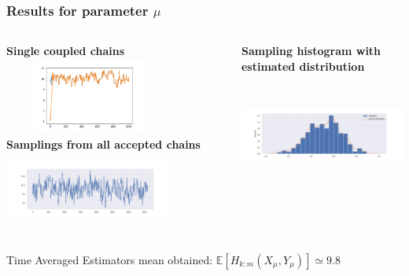 \documentclass{beamer}
\begin{document}
\begin{frame}
	\frametitle{Results for parameter $\mu$}
	\begin{columns}
		\begin{column}{0.4\textwidth}
		{\scriptsize \textbf{Single coupled chains}}\\
		\includegraphics[width=5.5cm,height=2.5cm]{doublecoupling_chainmeeting/doublecoupling_mu_chain_meeting}
		\vspace{0.2cm}
	{	\scriptsize \textbf{Samplings from all accepted chains }}\\
	\includegraphics[width=5.5cm,height=2.5cm]{doublecoupling_pack/doublecoupling_sampling_mu}
		\end{column}
	\begin{column}{0.4\textwidth}
		{\scriptsize \textbf{Sampling histogram with estimated distribution}}\\
		\includegraphics[width=6cm,height=4cm]{doublecoupling_pack/doublecoupling_mu_histogram_kernel}
	\end{column}
	\end{columns}

	\small
	Time Averaged Estimators mean obtained:	$ \mathbb{E}[H_{k:m}(X_{\mu}, Y_{\mu})] \simeq 9.8   %
	$
	
	
	
\end{frame}
\end{document}
